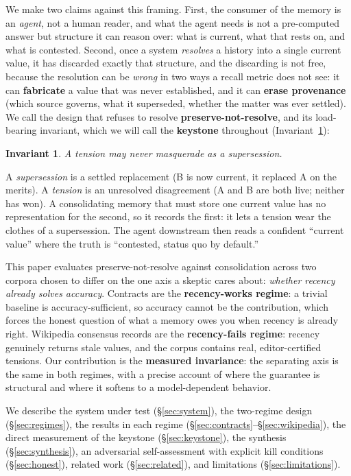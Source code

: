 \documentclass[11pt]{article}
\newtheorem{invariant}{Invariant}
\begin{document}
We make two claims against this framing. First, the consumer of the memory is an \emph{agent},
not a human reader, and what the agent needs is not a pre-computed answer but structure
it can reason over: what is current, what that rests on, and what is contested. Second,
once a system \emph{resolves} a history into a single current value, it has discarded exactly
that structure, and the discarding is not free, because the resolution can be \emph{wrong} in
two ways a recall metric does not see: it can \textbf{fabricate} a value that was never
established, and it can \textbf{erase provenance} (which source governs, what it superseded,
whether the matter was ever settled). We call the design that refuses to resolve
\textbf{preserve-not-resolve}, and its load-bearing invariant, which we will call the
\textbf{keystone} throughout (Invariant~\ref{inv:keystone}):

\begin{invariant}
\label{inv:keystone}
A tension may never masquerade as a supersession.
\end{invariant}

A \emph{supersession} is a settled replacement (B is now current, it replaced A on the merits).
A \emph{tension} is an unresolved disagreement (A and B are both live; neither has won). A
consolidating memory that must store one current value has no representation for the
second, so it records the first: it lets a tension wear the clothes of a supersession.
The agent downstream then reads a confident ``current value'' where the truth is ``contested,
status quo by default.''

This paper evaluates preserve-not-resolve against consolidation across two corpora chosen
to differ on the one axis a skeptic cares about: \emph{whether recency already solves
accuracy}. Contracts are the \textbf{recency-works regime}: a trivial baseline is
accuracy-sufficient, so accuracy cannot be the contribution, which forces the honest
question of what a memory owes you when recency is already right. Wikipedia consensus
records are the \textbf{recency-fails regime}: recency genuinely returns stale values, and the
corpus contains real, editor-certified tensions. Our contribution is the \textbf{measured
invariance}: the separating axis is the same in both regimes, with a precise account of
where the guarantee is structural and where it softens to a model-dependent behavior.

We describe the system under test (\S\ref{sec:system}), the two-regime design (\S\ref{sec:regimes}), the results in each
regime (\S\ref{sec:contracts}--\S\ref{sec:wikipedia}), the direct measurement of the keystone (\S\ref{sec:keystone}), the synthesis (\S\ref{sec:synthesis}), an
adversarial self-assessment with explicit kill conditions (\S\ref{sec:honest}), related work (\S\ref{sec:related}), and
limitations (\S\ref{sec:limitations}).
\end{document}
